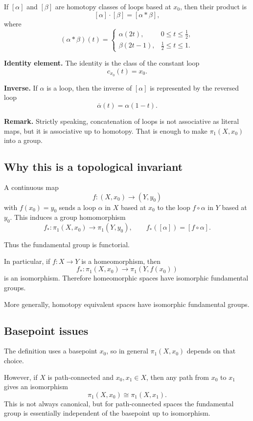 \documentclass[12pt,a4paper]{article}
\theoremstyle{notespace}
\begin{document}
If \([\alpha]\) and \([\beta]\) are homotopy classes of loops based at \(x_0\), then their product is
\[
[\alpha]\cdot[\beta]=[\alpha * \beta],
\]
where
\[
(\alpha * \beta)(t)=
\begin{cases}
	\alpha(2t), & 0\le t\le \frac12,\\[1ex]
	\beta(2t-1), & \frac12\le t\le 1.
\end{cases}
\]

\medskip

\textbf{Identity element.}
The identity is the class of the constant loop
\[
c_{x_0}(t)=x_0.
\]

\medskip

\textbf{Inverse.}
If \(\alpha\) is a loop, then the inverse of \([\alpha]\) is represented by the reversed loop
\[
\overline{\alpha}(t)=\alpha(1-t).
\]

\medskip

\textbf{Remark.}
Strictly speaking, concatenation of loops is not associative as literal maps, but it is associative up to homotopy. That is enough to make \(\pi_1(X,x_0)\) into a group.

\subsection{Why this is a topological invariant}

A continuous map
\[
f:(X,x_0)\to (Y,y_0)
\]
with \(f(x_0)=y_0\) sends a loop \(\alpha\) in \(X\) based at \(x_0\) to the loop \(f\circ \alpha\) in \(Y\) based at \(y_0\). This induces a group homomorphism
\[
f_*:\pi_1(X,x_0)\to \pi_1(Y,y_0),
\qquad
f_*([\alpha])=[f\circ \alpha].
\]

Thus the fundamental group is functorial.

In particular, if \(f:X\to Y\) is a homeomorphism, then
\[
f_*:\pi_1(X,x_0)\to \pi_1(Y,f(x_0))
\]
is an isomorphism. Therefore homeomorphic spaces have isomorphic fundamental groups.

More generally, homotopy equivalent spaces have isomorphic fundamental groups.

\subsection{Basepoint issues}

The definition uses a basepoint \(x_0\), so in general \(\pi_1(X,x_0)\) depends on that choice.

However, if \(X\) is path-connected and \(x_0,x_1\in X\), then any path from \(x_0\) to \(x_1\) gives an isomorphism
\[
\pi_1(X,x_0)\cong \pi_1(X,x_1).
\]
This is not always canonical, but for path-connected spaces the fundamental group is essentially independent of the basepoint up to isomorphism.
\end{document}
